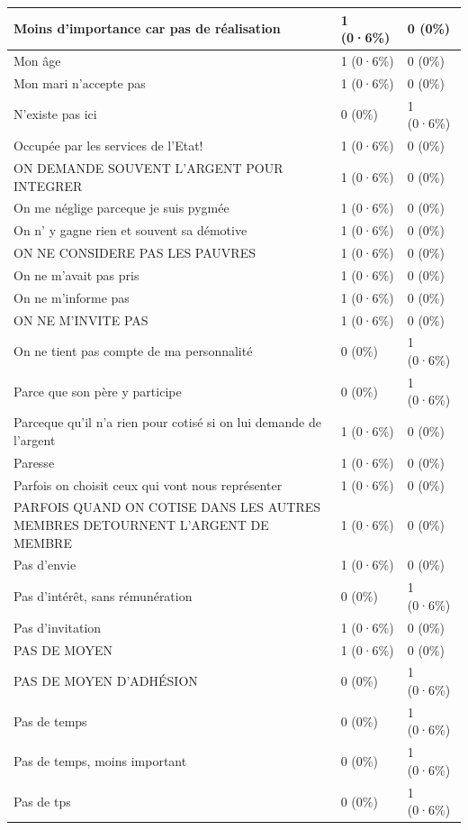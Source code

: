 \documentclass[
]{book}
\begin{document}
\begin{tabular}{l|l|l}
\hline
Moins d'importance car pas de réalisation & 1 (0·6\%) & 0 (0\%)\\
\hline
Mon âge & 1 (0·6\%) & 0 (0\%)\\
\hline
Mon mari n'accepte pas & 1 (0·6\%) & 0 (0\%)\\
\hline
N'existe pas ici & 0 (0\%) & 1 (0·6\%)\\
\hline
Occupée par les services de l'Etat! & 1 (0·6\%) & 0 (0\%)\\
\hline
ON DEMANDE SOUVENT L'ARGENT POUR INTEGRER & 1 (0·6\%) & 0 (0\%)\\
\hline
On me néglige parceque je suis pygmée & 1 (0·6\%) & 0 (0\%)\\
\hline
On n' y gagne rien et souvent sa démotive & 1 (0·6\%) & 0 (0\%)\\
\hline
ON NE CONSIDERE PAS LES PAUVRES & 1 (0·6\%) & 0 (0\%)\\
\hline
On ne m'avait pas pris & 1 (0·6\%) & 0 (0\%)\\
\hline
On ne m'informe pas & 1 (0·6\%) & 0 (0\%)\\
\hline
ON NE M'INVITE PAS & 1 (0·6\%) & 0 (0\%)\\
\hline
On ne tient pas compte de ma personnalité & 0 (0\%) & 1 (0·6\%)\\
\hline
Parce que son père y participe & 0 (0\%) & 1 (0·6\%)\\
\hline
Parceque qu'il n'a rien pour cotisé si on lui demande de l'argent & 1 (0·6\%) & 0 (0\%)\\
\hline
Paresse & 1 (0·6\%) & 0 (0\%)\\
\hline
Parfois on choisit ceux qui vont nous représenter & 1 (0·6\%) & 0 (0\%)\\
\hline
PARFOIS QUAND ON COTISE DANS  LES AUTRES MEMBRES DETOURNENT L'ARGENT DE MEMBRE & 1 (0·6\%) & 0 (0\%)\\
\hline
Pas d'envie & 1 (0·6\%) & 0 (0\%)\\
\hline
Pas d'intérêt, sans rémunération & 0 (0\%) & 1 (0·6\%)\\
\hline
Pas d'invitation & 1 (0·6\%) & 0 (0\%)\\
\hline
PAS DE MOYEN & 1 (0·6\%) & 0 (0\%)\\
\hline
PAS DE MOYEN D'ADHÉSION & 0 (0\%) & 1 (0·6\%)\\
\hline
Pas de temps & 0 (0\%) & 1 (0·6\%)\\
\hline
Pas de temps, moins important & 0 (0\%) & 1 (0·6\%)\\
\hline
Pas de tps & 0 (0\%) & 1 (0·6\%)\\

\end{tabular}
\end{document}
